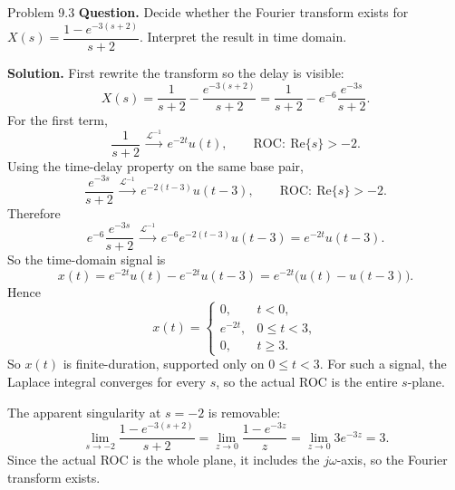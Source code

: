 \documentclass[10pt]{article}
\newcommand{\ROC}{\mathrm{ROC}}
\newcommand{\LT}{\mathcal{L}}
\newcommand{\Prompt}[1]{\textbf{Question.} #1}
\newcommand{\SketchLabel}{\tcblower\textbf{Solution.}}
\newcommand{\Linvpair}[2]{#1\,\mathrel{\overset{\LT^{-1}}{\longrightarrow}}\,#2}
\begin{document}
\begin{examplebox}{Problem 9.3}
  \Prompt{Decide whether the Fourier transform exists for \(X(s)=\dfrac{1-e^{-3(s+2)}}{s+2}\). Interpret the result in time domain.}

  \medskip
  \SketchLabel{}
  First rewrite the transform so the delay is visible:
  \[
    X(s)=\frac{1}{s+2}-\frac{e^{-3(s+2)}}{s+2}
    =\frac{1}{s+2}-e^{-6}\frac{e^{-3s}}{s+2}.
  \]
  For the first term,
  \[
    \Linvpair{\frac{1}{s+2}}{e^{-2t}u(t)},
    \qquad
    \ROC:\ \text{Re}\{s\}>-2.
  \]
  Using the time-delay property on the same base pair,
  \[
    \Linvpair{\frac{e^{-3s}}{s+2}}{e^{-2(t-3)}u(t-3)},
    \qquad
    \ROC:\ \text{Re}\{s\}>-2.
  \]
  Therefore
  \[
    \Linvpair{e^{-6}\frac{e^{-3s}}{s+2}}{e^{-6}e^{-2(t-3)}u(t-3)}
    =e^{-2t}u(t-3).
  \]
  So the time-domain signal is
  \[
    x(t)=e^{-2t}u(t)-e^{-2t}u(t-3)
    =e^{-2t}\bigl(u(t)-u(t-3)\bigr).
  \]
  Hence
  \[
    x(t)=
    \begin{cases}
      0, & t<0,\\[2pt]
      e^{-2t}, & 0\le t<3,\\[2pt]
      0, & t\ge 3.
    \end{cases}
  \]
  So \(x(t)\) is finite-duration, supported only on \(0\le t<3\). For such a signal, the Laplace integral converges for every \(s\), so the actual ROC is the entire \(s\)-plane.

  The apparent singularity at \(s=-2\) is removable:
  \[
    \lim_{s\to-2}\frac{1-e^{-3(s+2)}}{s+2}
    =\lim_{z\to0}\frac{1-e^{-3z}}{z}
    =\lim_{z\to0} 3e^{-3z}
    =3.
  \]
  Since the actual ROC is the whole plane, it includes the \(j\omega\)-axis, so the Fourier transform exists.


\end{examplebox}
\end{document}
